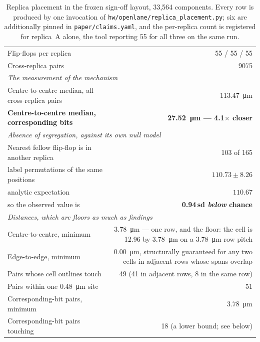 \documentclass[11pt,a4paper]{article}
\newcommand{\file}[1]{\texttt{\small #1}}
\begin{document}
\begin{table}[htbp]
\centering
\caption{Replica placement in the frozen sign-off layout, 33{,}564
components. Every row is produced by one invocation of
\file{hw/openlane/replica\_placement.py}; six are additionally pinned in
\file{paper/claims.yaml}, and the per-replica count is registered for
replica~A alone, the tool reporting 55 for all three on the same run.}
\label{tab:placement}
\small
\begin{tabular}{lr}
\toprule
Flip-flops per replica & 55 / 55 / 55 \\
Cross-replica pairs & \num{9075} \\
\midrule
\multicolumn{2}{l}{\emph{The measurement of the mechanism}}\\
Centre-to-centre median, all cross-replica pairs & \SI{113.47}{\micro\meter} \\
\textbf{Centre-to-centre median, corresponding bits} &
\textbf{\SI{27.52}{\micro\meter} --- 4.1$\times$ closer} \\
\midrule
\multicolumn{2}{l}{\emph{Absence of segregation, against its own null model}}\\
Nearest fellow flip-flop is in another replica & 103 of 165 \\
\quad 200 label permutations of the same positions & $110.73 \pm 8.26$ \\
\quad analytic expectation & $110.67$ \\
\quad so the observed value is & \textbf{0.94\,sd \emph{below} chance} \\
\midrule
\multicolumn{2}{l}{\emph{Distances, which are floors as much as findings}}\\
Centre-to-centre, minimum & \SI{3.78}{\micro\meter} --- one row, and the
floor: the cell is \SI{12.96}{} by \SI{3.78}{\micro\meter} on a
\SI{3.78}{\micro\meter} row pitch \\
Edge-to-edge, minimum & \SI{0.00}{\micro\meter}, structurally guaranteed
for any two cells in adjacent rows whose spans overlap \\
Pairs whose cell outlines touch & 49 (41 in adjacent rows, 8 in the same row) \\
Pairs within one \SI{0.48}{\micro\meter} site & 51 \\
Corresponding-bit pairs, minimum & \SI{3.78}{\micro\meter} \\
Corresponding-bit pairs touching & 18 (a lower bound; see below) \\
\bottomrule
\end{tabular}
\end{table}
\end{document}
